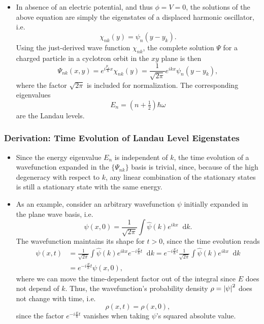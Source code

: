 \documentclass[11pt, a4paper]{article}
\newcommand{\diff}{\mathop{}\!\mathrm{d}} %
\newcommand{\F}[1]{\widehat{#1}} %
\newcommand{\p}{\psi}  %
\renewcommand{\P}{\Psi}  %
\begin{document}
\begin{itemize}
	\item In absence of an electric potential, and thus $ \phi = V = 0 $, the solutions of the above equation are simply the eigenstates of a displaced harmonic oscillator, i.e.
	\begin{equation*}
		\chi_{nk}(y) = \psi_{n}(y - y_{k}).
	\end{equation*}
	Using the just-derived wave function $ \chi_{nk} $, the complete solution $ \Psi $ for a charged particle in a cyclotron orbit in the $ xy $ plane is then
	\begin{equation*}
		\P_{nk}(x, y) = e^{i\frac{p_{x}}{\hbar}x}\chi_{nk}(y) = \frac{1}{\sqrt{2\pi}}e^{ikx} \psi_{n}(y - y_{k}),
	\end{equation*}
	where the factor $ \sqrt{2\pi} $ is included for normalization. The corresponding eigenvalues
	\begin{equation*}
		E_{n} = \left(n + \tfrac{1}{2}\right)\hbar \omega
	\end{equation*}
	are the Landau levels.
	
\end{itemize}

\subsubsection{Derivation: Time Evolution of Landau Level Eigenstates}
\begin{itemize}
	\item Since the energy eigenvalue $ E_{n} $ is independent of $ k $, the time evolution of a wavefunction expanded in the $ \{\P_{nk}\} $ basis is trivial, since, because of the high degeneracy with respect to $ k $, any linear combination of the stationary states is still a stationary state with the same energy.
	
	\item As an example, consider an arbitrary wavefunction $ \p $ initially expanded in the plane wave basis, i.e.
	\begin{equation*}
		\p(x, 0) = \frac{1}{\sqrt{2\pi}} \int \F{\p}(k)e^{ikx}\diff k.
	\end{equation*}
	The wavefunction maintains its shape for $ t > 0 $, since the time evolution reads
	\begin{align*}
		\p(x, t) &= \frac{1}{\sqrt{2\pi}} \int \F{\p}(k)e^{ikx}e^{-i\frac{E}{\hbar}t} \diff k = e^{-i\frac{E}{\hbar}t} \frac{1}{\sqrt{2\pi}} \int \F{\p}(k)e^{ikx}\diff k\\
		& = e^{-i\frac{E}{\hbar}t} \p(x, 0),
	\end{align*}
	where we can move the time-dependent factor out of the integral since $ E $ does not depend of $ k $. Thus, the wavefunction's probability density $ \rho = \abs{\p}^{2} $ does not change with time, i.e.
	\begin{equation*}
		\rho(x, t) = \rho(x, 0),
	\end{equation*}
	since the factor $ e^{-i\frac{E}{\hbar}t} $ vanishes when taking $ \p $'s squared absolute value.
	
\end{itemize}
\end{document}
